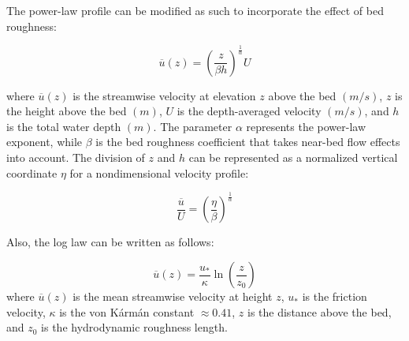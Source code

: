 \documentclass[12pt,sort&compress]{elsarticle}
\theoremstyle{definition}%
\begin{document}
The power-law profile can be modified as such to incorporate the effect of bed roughness:

\[
\overline{u}(z)
=
\left(
\frac{z}{\beta h}
\right)^{\frac{1}{\alpha}}
U
\]

where \(\overline{u}(z)\) is the streamwise velocity at elevation \(z\) above the bed \((m/s)\), \(z\) is the height above the bed \((m)\), \(U\) is the depth-averaged velocity \((m/s)\), and \(h\) is the total water depth \((m)\). The parameter \(\alpha\) represents the power-law exponent, while \(\beta\) is the bed roughness coefficient that takes near-bed flow effects into account. The division of $z$ and $h$ can be represented as a normalized vertical coordinate $\eta$ for a nondimensional velocity profile:

\[
\frac{\overline{u}}{U}
=
\left(
\frac{\eta}{\beta}
\right)^{\frac{1}{\alpha}}
\]

Also, the log law can be written as follows:

\[
\overline{u}(z)=
\frac{u_*}{\kappa}
\ln
\left(
\frac{z}{z_0}
\right)
\]
where $\overline{u}(z)$ is the mean streamwise velocity at height $z$, $u_*$ is the friction velocity, $\kappa$ is the von Kármán constant $\approx 0.41$, $z$ is the distance above the bed, and
$z_0$ is the hydrodynamic roughness length.



\end{document}
